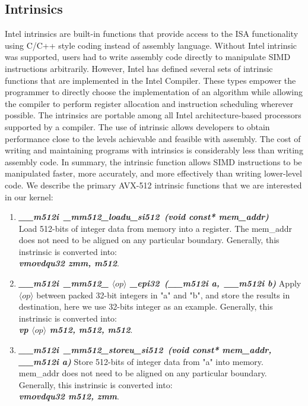 \documentclass[5p,times,twocolumn]{elsarticle}
\begin{document}
\subsection{Intrinsics}
Intel intrinsics are built-in functions that provide access to the ISA functionality
using C/C++ style coding instead of assembly language. Without Intel intrinsic was
supported, users had to write assembly code directly to manipulate SIMD
instructions arbitrarily.
However, Intel has defined several sets of intrinsic functions that are implemented
in the Intel Compiler. These types empower the programmer to directly choose the implementation
of an algorithm while allowing the compiler to perform register allocation
and instruction scheduling wherever possible. The intrinsics are portable among all
Intel architecture-based processors supported by a compiler. The use of intrinsic
allows developers to obtain performance close to the levels achievable and feasible with assembly.
The cost of writing and maintaining programs with intrinsics is considerably less than writing assembly code.
In summary, the intrinsic function allows SIMD instructions to be manipulated faster, more
accurately, and more effectively than writing lower-level code.
We describe the primary AVX-512 intrinsic functions that we are interested in our kernel:

\begin{enumerate}[]%
  \item \emph{\textbf{\textit{\_\_m512i\ \_mm512\_loadu\_si512\ (void const* mem\_addr)}}} \\
  Load 512-bits of integer data from memory into a register. The mem\_addr does not need to be aligned on any particular boundary.
  Generally, this instrinsic is converted into:\\
  \emph{\textbf{\textit{vmovdqu32  zmm,  m512}}}.
  \item \emph{\textbf{\textit{\_\_m512i\ \_mm512\_ $\langle op \rangle$ \_epi32\ (\_\_m512i a,\ \_\_m512i b)}}}
  Apply $\langle op \rangle$ between packed 32-bit integers in "a" and "b", and store the results in destination, here we use 32-bits integer as an example.
  Generally, this instrinsic is converted into:\\
  \emph{\textbf{\textit{vp $\langle op \rangle$  m512,  m512,  m512}}}.
  \item \emph{\textbf{\textit{\_\_m512i\ \_mm512\_storeu\_si512\ (void const* mem\_addr,\\ \_\_m512i a)}}}
  Store 512-bits of integer data from "a" into memory. mem\_addr does not need to be aligned on any particular boundary.
  Generally, this instrinsic is converted into:\\
  \emph{\textbf{\textit{vmovdqu32  m512, zmm}}}.
\end{enumerate}
\end{document}
